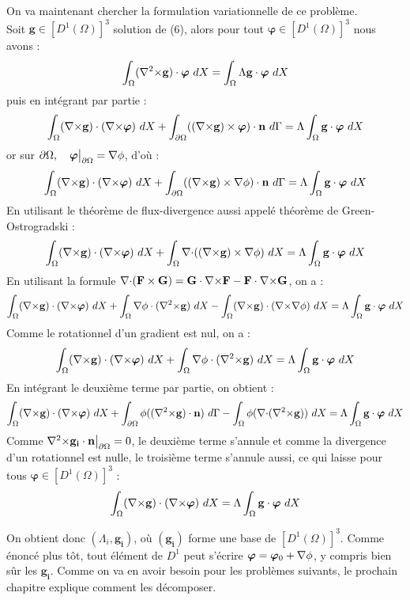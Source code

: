 On va maintenant chercher la formulation variationnelle de ce problème.\\
Soit $\mathbf{g}\in [D^1(\Omega)]^3$ solution de (6), alors pour tout $\bm{\varphi}\in [D^1(\Omega)]^3$ nous avons :
\[
\int_\Omega ({\nabla^2\times} \mathbf{g})\cdot\bm{\varphi}\ dX = \int_\Omega\Lambda \mathbf{g}\cdot\bm{\varphi}\ dX
\]
puis en intégrant par partie :
\[
\int_\Omega ({\nabla\times} \mathbf{g})\cdot({\nabla\times}\bm{\varphi})\ dX + \int_{\partial\Omega} (({\nabla\times} \mathbf{g})\times \bm{\varphi})\cdot \mathbf{n}\ d\Gamma = \Lambda\int_\Omega \mathbf{g}\cdot\bm{\varphi}\ dX
\]
or sur $\partial\Omega,\quad \bm{\varphi}{\big\rvert_{\partial\Omega}}={\nabla}\phi$, d'où :
\[
\int_\Omega ({\nabla\times} \mathbf{g})\cdot({\nabla\times}\bm{\varphi})\ dX + \int_{\partial\Omega} (({\nabla\times} \mathbf{g})\times {\nabla}\phi)\cdot \mathbf{n}\ d\Gamma = \Lambda\int_\Omega \mathbf{g}\cdot\bm{\varphi}\ dX
\]
En utilisant le théorème de flux-divergence aussi appelé théorème de Green-Ostrogradski :
\[
\int_\Omega ({\nabla\times} \mathbf{g})\cdot({\nabla\times}\bm{\varphi})\ dX + \int_\Omega {\nabla\cdot}(({\nabla\times} \mathbf{g})\times {\nabla}\phi)\ dX = \Lambda\int_\Omega \mathbf{g}\cdot\bm{\varphi}\ dX
\]
En utilisant la formule ${\nabla\cdot}(\mathbf{F}\times \mathbf{G}) = \mathbf{G}\cdot {\nabla\times} \mathbf{F} - \mathbf{F}\cdot {\nabla\times} \mathbf{G}$, on a :
\[
\int_\Omega (\rot \mathbf{g})\cdot(\rot\bm{\varphi})\ dX + \int_\Omega \grad\phi\cdot(\rott \mathbf{g})\ dX -\int_\Omega (\rot \mathbf{g})\cdot (\rot\grad\phi)\ dX  = \Lambda\int_\Omega \mathbf{g}\cdot\bm{\varphi}\ dX
\]
Comme le rotationnel d'un gradient est nul, on a :
\[
\int_\Omega ({\nabla\times} \mathbf{g})\cdot({\nabla\times}\bm{\varphi})\ dX + \int_\Omega {\nabla}\phi\cdot({\nabla^2\times} \mathbf{g})\ dX  = \Lambda\int_\Omega \mathbf{g}\cdot\bm{\varphi}\ dX
\]
En intégrant le deuxième terme par partie, on obtient :
\[
\int_\Omega ({\nabla\times} \mathbf{g})\cdot({\nabla\times}\bm{\varphi})\ dX + \int_{\partial\Omega} \phi(({\nabla^2\times} \mathbf{g})\cdot \mathbf{n})\ d\Gamma - \int_\Omega \phi({\nabla\cdot}({\nabla^2\times} \mathbf{g}))\ dX  = \Lambda\int_\Omega \mathbf{g}\cdot\bm{\varphi}\ dX
\]
Comme ${\nabla^2\times}  \mathbf{g_i}\cdot \mathbf{n}{\big\rvert_{\partial\Omega}} = 0$, le deuxième terme s'annule et comme la divergence d'un rotationnel est nulle, le troisième terme s'annule aussi, ce qui laisse pour tous $\bm{\varphi}\in [D^1(\Omega)]^3$ :
\begin{equation}
\label{fveigen}
\int_\Omega ({\nabla\times} \mathbf{g})\cdot({\nabla\times}\bm{\varphi})\ dX = \Lambda\int_\Omega \mathbf{g}\cdot\bm{\varphi}\ dX
\end{equation}

On obtient donc $(\Lambda_i,\mathbf{g_i})$, où $(\mathbf{g_i})$ forme une base de $[D^1(\Omega)]^3$. Comme énoncé plus tôt, tout élément de $D^1$ peut s'écrire $\bm{\varphi} = \bm{\varphi}_0 + {\nabla}\phi$, y compris bien sûr les $\mathbf{g_i}$. Comme on va en avoir besoin pour les problèmes suivants, le prochain chapitre explique comment les décomposer.

